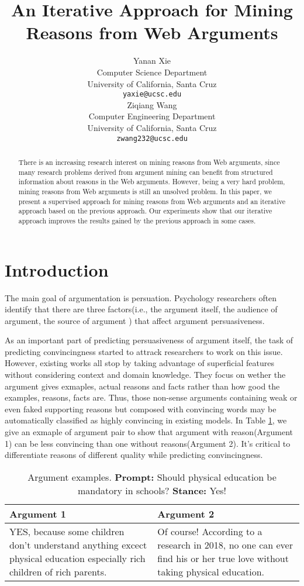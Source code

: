 \documentclass[11pt,a4paper]{article}
\title{An Iterative Approach for Mining Reasons from Web Arguments}
\author{Yanan Xie \\
Computer Science Department\\
University of California, Santa Cruz\\
  {\tt yaxie@ucsc.edu} \\\And
  Ziqiang Wang \\
Computer Engineering Department\\
University of California, Santa Cruz\\
  {\tt zwang232@ucsc.edu} \\}
\date{}
\begin{document}
\maketitle
\begin{abstract}
There is an increasing research interest on mining reasons from Web arguments, since many research problems derived from argument mining can benefit from structured information about reasons in the Web arguments. However, being a very hard problem, mining reasons from Web arguments is still an unsolved problem. In this paper, we present a supervised approach for mining reasons from Web arguments and an iterative approach based on the previous approach. Our experiments show that our iterative approach improves the results gained by the previous approach in some cases.
\end{abstract}

\section{Introduction}

The main goal of argumentation is persuation\cite{nettel2012persuasive, mercier2011humans, blair2012argumentation}. Psychology researchers often identify that there are three factors(i.e., the argument itself, the audience of argument, the source of argument ) that affect argument persuasiveness\cite{petty1986elaboration}. 

As an important part of predicting persuasiveness of argument itself, the task of predicting convincingness started to attrack researchers to work on this issue\cite{habernal2016argument}. However, existing works all stop by taking advantage of superficial features without considering context and domain knowledge. They focus on wether the argument gives exmaples, actual reasons and facts rather than how good the examples, reasons, facts are. Thus, those non-sense arguments containing weak or even faked supporting reasons but composed with convincing words may be automatically classified as highly convincing in existing models. In Table \ref{table:argumentexamples}, we give an exmaple of argument pair to show that argument with reason(Argument 1) can be less convincing than one without reasons(Argument 2). It's critical to differentiate reasons of different quality while predicting convincingness. 

\begin{table}[h]
\begin{tabular}{| p{3.5cm} | p{3.5cm} | }
\hline
{\bf Argument 1} & {\bf Argument 2} \\
\hline
YES, because some children don’t understand anything excect physical education especially rich children of rich parents. & Of course!  According to a research in 2018, no one can ever find his or her true love without taking physical education.\\
\hline

\end{tabular}
\caption{Argument examples. {\bf Prompt:} Should physical education be mandatory in schools? {\bf Stance:} Yes!} 
\label{table:argumentexamples}
\end{table}
\end{document}
